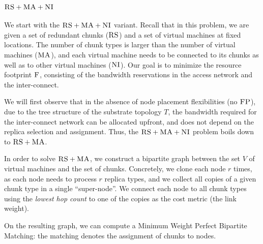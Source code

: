 \documentclass[9pt]{sigcomm-alternate}
\newcommand{\MaFactor}{r}
\newcommand{\ChunkType}{\tau}
\newcommand{\VirtualNodes}{\ensuremath{V}}
\newcommand{\CC}{\textsc{NI}}
\newcommand{\FP}{\textsc{FP}}
\newcommand{\RS}{\textsc{RS}}
\newcommand{\MA}{\textsc{MA}}
\newcommand{\Cost}{\textsc{F}}
\newcommand{\Tree}{\ensuremath{T}}
\begin{document}
\subsubsection{$\RS+\MA+\CC$}

We start with the $\RS+\MA+\CC$ variant.
Recall that in this problem,
we are given a set of redundant chunks ($\RS$) and a set of virtual machines
at fixed locations. The number of chunk types is larger than the number
of virtual machines ($\MA$), and each virtual machine needs to be connected
to its chunks as well as to other virtual machines ($\CC$).
Our goal is to minimize the resource footprint $\Cost$, consisting
of the bandwidth reservations in the access network and the inter-connect.

We will first observe that in the absence of node placement flexibilities (no $\FP$),
due to the tree structure of the substrate topology $\Tree$, the bandwidth required
for the inter-connect network can be allocated upfront, and does not depend on the replica
selection and assignment. Thus, the $\RS+\MA+\CC$ problem boils down to $\RS+\MA$.

In order to solve $\RS+\MA$, we construct a bipartite graph between the set
$\VirtualNodes$ of virtual machines and
the set of chunks.
Concretely, we clone each node $\MaFactor$ times,
as each node needs to process
$\MaFactor$ replica types, and we collect all copies of a given chunk type in a
single %
``super-node''. We connect each node to all chunk types using the
\emph{lowest hop count} to one of the copies as the cost metric (the link weight).

On the resulting graph, we can compute a Minimum Weight
Perfect Bipartite
Matching:
the matching denotes the assignment of chunks to nodes.

\end{document}
